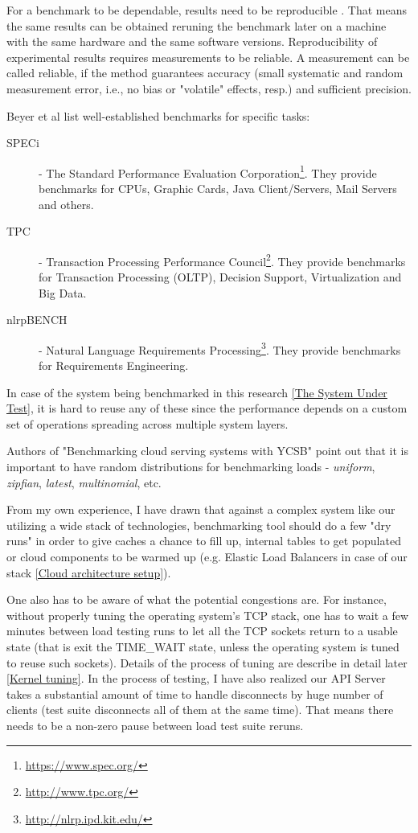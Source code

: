 \documentclass{uvamscse}
\begin{document}
For a benchmark to be dependable, results need to be reproducible \cite{BornBen}. That means the same results can be obtained reruning the benchmark later on a machine with the same hardware and the same software versions. Reproducibility of experimental results requires measurements to be reliable. A measurement can be called reliable, if the method guarantees accuracy (small systematic and random measurement error, i.e., no bias or "volatile" effects, resp.) and sufficient precision.

Beyer et al \cite{BenRM} list well-established benchmarks for specific tasks:
\begin{description}
  \item[SPECi]
  - The Standard Performance Evaluation Corporation\footnote{\url{https://www.spec.org/}}. They provide benchmarks for CPUs, Graphic Cards, Java Client/Servers, Mail Servers and others.
  \item[TPC]
  - Transaction Processing Performance Council\footnote{\url{http://www.tpc.org/}}. They provide benchmarks for Transaction Processing (OLTP), Decision Support, Virtualization and Big Data.
  \item[nlrpBENCH]
  - Natural Language Requirements Processing\footnote{\url{http://nlrp.ipd.kit.edu/}}. They provide benchmarks for Requirements Engineering.
\end{description}

In case of the system being benchmarked in this research \ref{The System Under Test}, it is hard to reuse any of these since the performance depends on a custom set of operations spreading across multiple system layers.

Authors of "Benchmarking cloud serving systems with YCSB" \cite{Ycsb} point out that it is important to have random distributions for benchmarking loads - \textit{uniform}, \textit{zipfian}, \textit{latest}, \textit{multinomial}, etc.

From my own experience, I have drawn that against a complex system like our utilizing a wide stack of technologies, benchmarking tool should do a few "dry runs" in order to give caches a chance to fill up, internal tables to get populated or cloud components to be warmed up (e.g. Elastic Load Balancers in case of our stack \ref{Cloud architecture setup}).

One also has to be aware of what the potential congestions are. For instance, without properly tuning the operating system's TCP stack, one has to wait a few minutes between load testing runs to let all the TCP sockets return to a usable state (that is exit the TIME\_WAIT state, unless the operating system is tuned to reuse such sockets). Details of the process of tuning are describe in detail later \ref{Kernel tuning}. In the process of testing, I have also realized our API Server takes a substantial amount of time to handle disconnects by huge number of clients (test suite disconnects all of them at the same time). That means there needs to be a non-zero pause between load test suite reruns.
\end{document}
